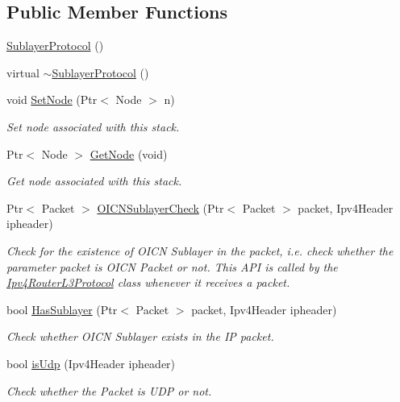 \subsection*{Public Member Functions}
\begin{DoxyCompactItemize}
\item 
\hyperlink{classns3_1_1SublayerProtocol_aad21195a67f44c4b4baa72cff040c253}{Sublayer\-Protocol} ()
\item 
virtual \hyperlink{classns3_1_1SublayerProtocol_a0e26c084de2a7c809d8d583c28231215}{$\sim$\-Sublayer\-Protocol} ()
\item 
void \hyperlink{classns3_1_1SublayerProtocol_ae0c35330ed5b9f0c7b109b6ef58b37e6}{Set\-Node} (Ptr$<$ Node $>$ n)
\begin{DoxyCompactList}\small\item\em Set node associated with this stack. \end{DoxyCompactList}\item 
Ptr$<$ Node $>$ \hyperlink{classns3_1_1SublayerProtocol_a6fe8316415eb6ac5d2f41238cba179b2}{Get\-Node} (void)
\begin{DoxyCompactList}\small\item\em Get node associated with this stack. \end{DoxyCompactList}\item 
Ptr$<$ Packet $>$ \hyperlink{classns3_1_1SublayerProtocol_a32f7f8db439df22d32e645249c188de1}{O\-I\-C\-N\-Sublayer\-Check} (Ptr$<$ Packet $>$ packet, Ipv4\-Header ipheader)
\begin{DoxyCompactList}\small\item\em Check for the existence of O\-I\-C\-N Sublayer in the packet, i.\-e. check whether the parameter packet is O\-I\-C\-N Packet or not. This A\-P\-I is called by the \hyperlink{classns3_1_1Ipv4RouterL3Protocol}{Ipv4\-Router\-L3\-Protocol} class whenever it receives a packet. \end{DoxyCompactList}\item 
bool \hyperlink{classns3_1_1SublayerProtocol_adc7c2b22a960eabf0f6a39651b2702f3}{Has\-Sublayer} (Ptr$<$ Packet $>$ packet, Ipv4\-Header ipheader)
\begin{DoxyCompactList}\small\item\em Check whether O\-I\-C\-N Sublayer exists in the I\-P packet. \end{DoxyCompactList}\item 
bool \hyperlink{classns3_1_1SublayerProtocol_ad32d482504ca8f25fa6a710ef8b232f2}{is\-Udp} (Ipv4\-Header ipheader)
\begin{DoxyCompactList}\small\item\em Check whether the Packet is U\-D\-P or not. \end{DoxyCompactList}\item 

\end{DoxyCompactItemize}
